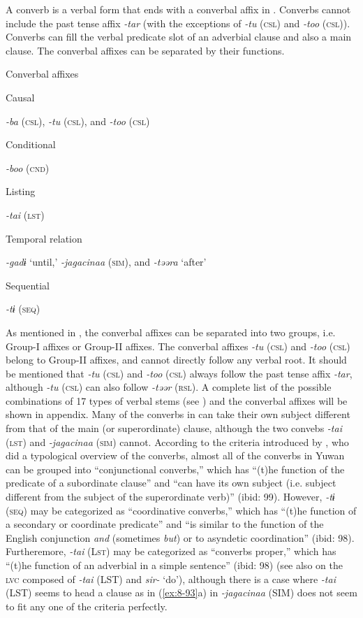 A converb is a verbal form that ends with a converbal affix in . Converbs cannot include the past tense affix \textit{-tar} (with the exceptions of \textit{-tu} (\textsc{csl}) and \textit{-too} (\textsc{csl})). Converbs can fill the verbal predicate slot of an adverbial clause and also a main clause. The converbal affixes can be separated by their functions.

\ea\label{ex:8-84}
  Converbal affixes

\ea Causal

    \textit{-ba} (\textsc{csl}), \textit{-tu} (\textsc{csl}), and \textit{-too} (\textsc{csl})


\ex Conditional

    \textit{-boo} (\textsc{cnd})


\ex Listing

    \textit{-tai} (\textsc{lst})


\ex Temporal relation

    \textit{-gadɨ} ‘until,’ \textit{-jagacinaa} (\textsc{sim}), and \textit{-təəra} ‘after’


\ex Sequential

    \textit{-tɨ} (\textsc{seq})
\z
\z

As mentioned in , the converbal affixes can be separated into two groups, i.e. Group-I affixes or Group-II affixes. The converbal affixes \textit{-tu} (\textsc{csl}) and \textit{-too} (\textsc{csl}) belong to Group-II affixes, and cannot directly follow any verbal root. It should be mentioned that \textit{-tu} (\textsc{csl}) and \textit{-too} (\textsc{csl}) always follow the past tense affix \textit{-tar}, although \textit{-tu} (\textsc{csl}) can also follow \textit{-təər} (\textsc{rsl}). A complete list of the possible combinations of 17 types of verbal stems (see ) and the converbal affixes will be shown in appendix. Many of the converbs in  can take their own subject different from that of the main (or superordinate) clause, although the two convebs \textit{-tai} (\textsc{lst}) and \textit{-jagacinaa} (\textsc{sim}) cannot. According to the criteria introduced by \citet[98-99]{Nedjalkov1995}, who did a typological overview of the converbs, almost all of the converbs in Yuwan can be grouped into “conjunctional converbs,” which has “(t)he function of the predicate of a subordinate clause” and “can have its own subject (i.e. subject different from the subject of the superordinate verb)” (ibid: 99). However, \textit{-tɨ} (\textsc{seq}) may be categorized as “coordinative converbs,” which has “(t)he function of a secondary or coordinate predicate” and “is similar to the function of the English conjunction \textit{and} (sometimes \textit{but}) or to asyndetic coordination” (ibid: 98). Furtheremore, \textit{-tai} (L\textsc{st}) may be categorized as “converbs proper,” which has “(t)he function of an adverbial in a simple sentence” (ibid: 98) (see also  on the \textsc{lvc} composed of \textit{-tai} (LST) and \textit{sir-} ‘do’), although there is a case where \textit{-tai} (LST) seems to head a clause as in (\ref{ex:8-93}a) in  \textit{-jagacinaa} (SIM) does not seem to fit any one of the criteria perfectly.

